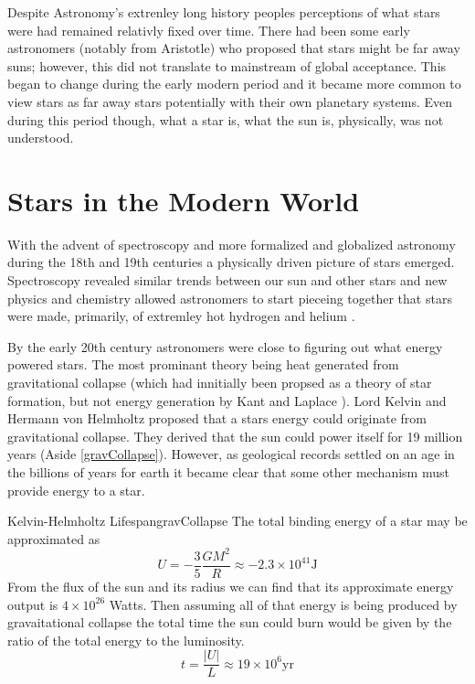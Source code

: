 Despite Astronomy's extrenley long history peoples perceptions of what
stars were had remained relativly fixed over time. There had been some early
astronomers (notably from Aristotle) who proposed that stars might be far away
suns; however, this did not translate to mainstream of global acceptance. This began
to change during the early modern period and it became more common to view stars
as far away stars potentially with their own planetary systems. Even during this
period though, what a star is, what the sun is, physically, was not understood.

\section{Stars in the Modern World}
With the advent of spectroscopy and more formalized and globalized astronomy
during the 18th and 19th centuries a physically driven picture of stars emerged.
Spectroscopy revealed similar trends between our sun and other stars and new
physics and chemistry allowed astronomers to start pieceing together that stars
were made, primarily, of extremley hot hydrogen and helium \addcite.

By the early 20th century astronomers were close to figuring out what energy
powered stars. The most prominant theory being heat generated from
gravitational collapse (which had innitially been propsed as a theory of star
formation, but not energy generation by Kant and Laplace \addcite). Lord Kelvin
and Hermann von Helmholtz proposed that a stars energy could originate from
gravitational collapse. They derived that the sun could power itself for 19
million years \addcite (Aside \ref{gravCollapse}). However, as
geological records settled on an age in the billions of years for earth it
became clear that some other mechanism must provide energy to a star.


\begin{sidebar}{Kelvin-Helmholtz Lifespan}{gravCollapse}
  The total binding energy of a star may be approximated as
  \begin{equation*}
    U = -\frac{3}{5}\frac{GM^{2}}{R} \approx -2.3 \times 10^{41} \text{J}
  \end{equation*}
  From the flux of the sun and its radius we can find that its approximate
  energy output is $4\times 10^{26}$ Watts. Then assuming all of that
  energy is being produced by gravaitational collapse the total 
  time the sun could burn would be given by the ratio of the total
  energy to the luminosity.
  \begin{equation*}
    t = \frac{|U|}{L} \approx 19 \times 10^{6} \text{yr}
  \end{equation*}
\end{sidebar}

